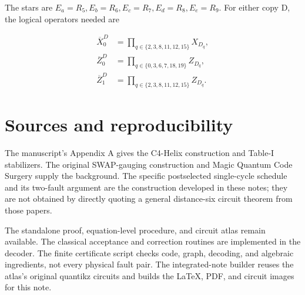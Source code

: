 \documentclass[11pt]{article}
\begin{document}
The stars are \(E_a=R_5,E_b=R_6,E_c=R_7,E_d=R_8,E_e=R_9\). For either copy D, the logical operators needed are

\[
\begin{aligned}
\overline X^D_0&=\prod_{q\in\{2,3,8,11,12,15\}}X_{D_q},\\
\overline Z^D_0&=\prod_{q\in\{0,3,6,7,18,19\}}Z_{D_q},\\
\overline Z^D_1&=\prod_{q\in\{2,3,8,11,12,15\}}Z_{D_q}.
\end{aligned}
\]

\section{Sources and reproducibility}
The manuscript's Appendix A gives the C4-Helix construction and Table-I stabilizers. The original SWAP-gauging construction and Magic Quantum Code Surgery supply the background. The specific postselected single-cycle schedule and its two-fault argument are the construction developed in these notes; they are not obtained by directly quoting a general distance-six circuit theorem from those papers.

The standalone proof, equation-level procedure, and circuit atlas remain available. The classical acceptance and correction routines are implemented in the decoder. The finite certificate script checks code, graph, decoding, and algebraic ingredients, not every physical fault pair. The integrated-note builder reuses the atlas's original quantikz circuits and builds the LaTeX, PDF, and circuit images for this note.
\end{document}
